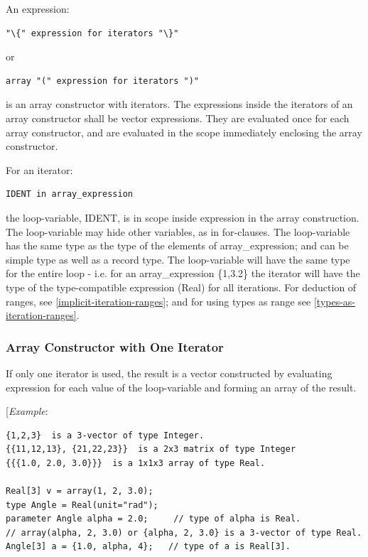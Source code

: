 \documentclass[10pt,a4paper]{report}
\def\doublelabel#1{\label{#1}\hypertarget{#1}{}}
\begin{document}
An expression:
\begin{lstlisting}[language=grammar]
"\{" expression for iterators "\}"
\end{lstlisting}
or
\begin{lstlisting}[language=grammar]
array "(" expression for iterators ")"
\end{lstlisting}

is an array constructor with iterators. The expressions inside the
iterators of an array constructor shall be vector expressions. They are
evaluated once for each array constructor, and are evaluated in the
scope immediately enclosing the array constructor.

For an iterator:
\begin{lstlisting}[language=modelica]
IDENT in array_expression
\end{lstlisting}

the loop-variable, IDENT, is in scope inside expression in the array
construction. The loop-variable may hide other variables, as in
for-clauses. The loop-variable has the same type as the type of the
elements of array\_expression; and can be simple type as well as a
record type. The loop-variable will have the same type for the entire
loop - i.e. for an array\_expression \{1,3.2\} the iterator will have
the type of the type-compatible expression (Real) for all iterations.
For deduction of ranges, see \ref{implicit-iteration-ranges}; and for using types as
range see \ref{types-as-iteration-ranges}.

\subsubsection{Array Constructor with One Iterator}\doublelabel{array-constructor-with-one-iterator}

If only one iterator is used, the result is a vector constructed by
evaluating expression for each value of the loop-variable and forming an
array of the result.

{[}\emph{Example}:
\begin{lstlisting}[language=modelica]
{1,2,3}  is a 3-vector of type Integer. 
{{11,12,13}, {21,22,23}}  is a 2x3 matrix of type Integer 
{{{1.0, 2.0, 3.0}}}  is a 1x1x3 array of type Real. 

Real[3] v = array(1, 2, 3.0); 
type Angle = Real(unit="rad");     
parameter Angle alpha = 2.0;     // type of alpha is Real. 
// array(alpha, 2, 3.0) or {alpha, 2, 3.0} is a 3-vector of type Real. 
Angle[3] a = {1.0, alpha, 4};   // type of a is Real[3].
\end{lstlisting}
\end{document}
